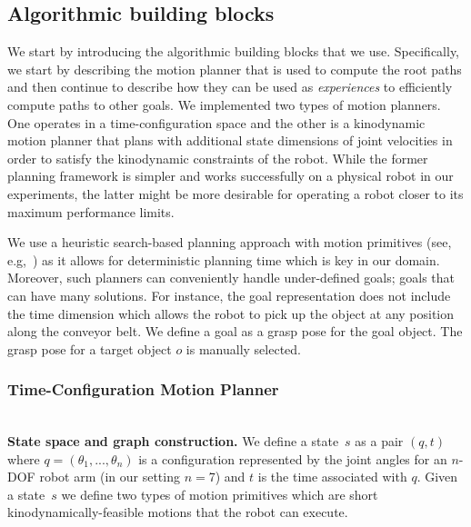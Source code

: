 \documentclass[a4paper]{report}
\begin{document}
\subsection{Algorithmic building blocks}
\label{subsec:alg_building_blocks}
We start by introducing the algorithmic building blocks that we use.
Specifically, we start by describing the motion planner \calP  that is used to compute the root paths 
and then continue to describe how they can be used as \emph{experiences} to efficiently compute paths to other goals.
We implemented two types of motion planners. One operates in a time-configuration space and the other is a kinodynamic motion planner that plans with additional state dimensions of joint velocities in order to satisfy the kinodynamic constraints of the robot. While the former planning framework is simpler and works successfully on a physical robot in our experiments, the latter might be more desirable for operating a robot closer to its maximum performance limits.

We use a heuristic search-based planning approach with motion primitives (see, e.g,~\cite{CCL10,CSCL11,LF09})
as it allows for deterministic planning time which is key in our domain.
Moreover, such planners can conveniently handle under-defined goals; goals that can have many solutions.
For instance, the goal representation does not include the time dimension which allows the robot to pick up the object at any position along the conveyor belt. 
We define a goal as a grasp pose for the goal object. The grasp pose for a target object $o$ is manually selected.
\subsubsection{Time-Configuration Motion Planner}
\hfill\\
\textbf{State space and graph construction.}
We define a state~$s$ as a pair $(q,t)$ where $q = (\theta_1, ..., \theta_n)$ is a configuration represented by the joint angles for an $n$-DOF robot arm (in our setting $n=$7) and $t$ is the time associated with $q$.
%
Given a state~$s$ we define two types of motion primitives which are short kinodynamically-feasible motions that the robot can execute.
%
\end{document}
